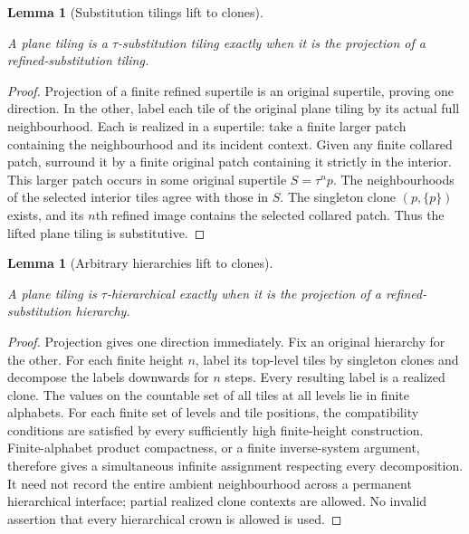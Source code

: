 \documentclass[11pt,a4paper]{article}
\newtheorem{lemma}[definition]{Lemma}
\theoremstyle{remark}
\newcommand{\lean}[1]{}
\newcommand{\uses}[1]{}
\begin{document}
\begin{lemma}[Substitution tilings lift to clones]\label{lem:clone-substitution-lift}
\lean{Tilings.FLC.substitution_clone_lift_iff}
\uses{def:clones,lem:clone-sts,def:hierarchy}
A plane tiling is a $\tau$-substitution tiling exactly when it is the
projection of a refined-substitution tiling.
\end{lemma}
\begin{proof}
Projection of a finite refined supertile is an original supertile, proving
one direction. In the other, label each tile of the original plane tiling
by its actual full neighbourhood. Each is realized in a supertile:
take a finite larger patch containing the neighbourhood and its incident
context. Given any finite collared patch, surround it by a finite original
patch containing it strictly in the interior. This larger patch occurs in
some original supertile $S=\tau^n p$. The neighbourhoods of the selected
interior tiles agree with those in $S$. The singleton clone $(p,\{p\})$
exists, and its $n$th refined image contains the selected collared patch.
Thus the lifted plane tiling is substitutive.
\end{proof}

\begin{lemma}[Arbitrary hierarchies lift to clones]\label{lem:clone-hierarchy-lift}
\lean{Tilings.FLC.hierarchy_clone_lift_iff}
\uses{def:clones,lem:clone-sts,def:hierarchy,lem:localfinite}
A plane tiling is $\tau$-hierarchical exactly when it is the projection of
a refined-substitution hierarchy.
\end{lemma}
\begin{proof}
Projection gives one direction immediately. Fix an original hierarchy for
the other. For each finite height $n$, label its top-level tiles by
singleton clones and decompose the labels downwards for $n$ steps.
Every resulting label is a realized clone. The values on the countable
set of all tiles at all levels lie in finite alphabets. For each finite
set of levels and tile positions, the compatibility conditions are
satisfied by every sufficiently high finite-height construction.
Finite-alphabet product compactness, or a finite inverse-system argument,
therefore gives a simultaneous infinite assignment respecting every
decomposition. It need not record the entire ambient neighbourhood across
a permanent hierarchical interface; partial realized clone contexts are
allowed. No invalid assertion that every hierarchical crown is allowed is
used.
\end{proof}
\end{document}
